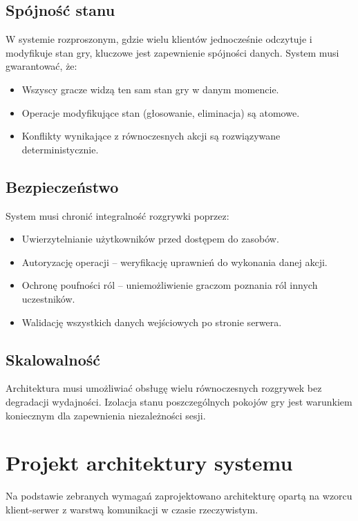 ﻿\documentclass[a4paper,twoside,11pt]{mwrep}
\theoremstyle{plain} \newtheorem{thm}{Twierdzenie}
\theoremstyle{plain} \newtheorem{lem}{Lemat}
\theoremstyle{definition} \newtheorem{defn}{Definicja}
\theoremstyle{remark} \newtheorem*{rem}{Wniosek}
\begin{document}
\subsection{Spójność stanu}

W systemie rozproszonym, gdzie wielu klientów jednocześnie odczytuje i modyfikuje stan gry, kluczowe jest zapewnienie spójności danych. System musi gwarantować, że:
\begin{itemize}
    \item Wszyscy gracze widzą ten sam stan gry w danym momencie.
    \item Operacje modyfikujące stan (głosowanie, eliminacja) są atomowe.
    \item Konflikty wynikające z równoczesnych akcji są rozwiązywane deterministycznie.
\end{itemize}

\subsection{Bezpieczeństwo}

System musi chronić integralność rozgrywki poprzez:
\begin{itemize}
    \item Uwierzytelnianie użytkowników przed dostępem do zasobów.
    \item Autoryzację operacji -- weryfikację uprawnień do wykonania danej akcji.
    \item Ochronę poufności ról -- uniemożliwienie graczom poznania ról innych uczestników.
    \item Walidację wszystkich danych wejściowych po stronie serwera.
\end{itemize}

\subsection{Skalowalność}

Architektura musi umożliwiać obsługę wielu równoczesnych rozgrywek bez degradacji wydajności. Izolacja stanu poszczególnych pokojów gry jest warunkiem koniecznym dla zapewnienia niezależności sesji.

\section{Projekt architektury systemu}

Na podstawie zebranych wymagań zaprojektowano architekturę opartą na wzorcu klient-serwer z warstwą komunikacji w czasie rzeczywistym.
\end{document}

